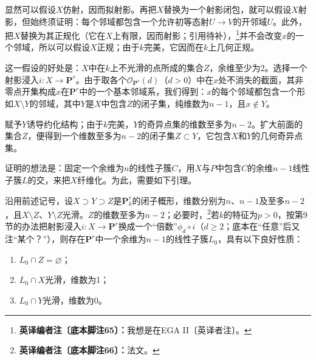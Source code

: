 显然可以假设$X$仿射，因而拟射影。再把$X$替换为一个射影闭包，就可以假设$X$射影，但始终须证明：每个邻域都包含一个允许初等态射$U\to V$的开邻域$U$。此外，把$X$替换为其正规化（它在$X$上有限，因而射影；引用待补），\footnote{\textbf{英译编者注〔底本脚注65〕：}我想是在EGA II〔英译者注〕。}并不会改变$x$的一个邻域，所以可以假设$X$正规；由于$k$完美，它因而在$k$上几何正规。


这一假设的好处是：$X$中在$k$上不光滑的点所成的集合$Z$，余维至少为2。选择一个射影浸入$i\colon X\to\mathbf P^r$。由于取各个$\mathcal O_{\mathbf P^r}(d)$（$d>0$）中在$x$处不消失的截面，其非零点开集构成$x$在$\mathbf P^r$中的一个基本邻域系，我们得到：$x$的每个邻域都包含一个形如$X\setminus Y$的邻域，其中$Y$是$X$中包含$Z$的闭子集，纯维数为$n-1$，且$x\notin Y$。

赋予$Y$诱导约化结构；由于$k$完美，$Y$的奇异点集的维数至多为$n-2$。扩大前面的集合$Z$，便得到一个维数至多为$n-2$的闭子集$Z\subset Y$，它包含$X$和$Y$的几何奇异点集。

证明的想法是：固定一个余维为$n$的线性子簇$C$，用$X$与$P$中包含$C$的余维$n-1$线性子簇$L$的交，来把$X$纤维化。为此，需要如下引理。

沿用前述记号，设$X\supset Y\supset Z$是$\mathbf P^r_k$的闭子概形，维数分别为$n$、$n-1$及至多$n-2$，且$X\setminus Z$、$Y\setminus Z$光滑。$Z$的维数至多为$n-2$；必要时，\footnote{\textbf{英译编者注〔底本脚注66〕：}法文。}若$k$的特征为$p>0$，按第9节的办法把射影浸入$i\colon X\to\mathbf P^r$换成一个“倍数”$\phi_d\circ i$（$d\geq2$；底本在“任意”后又注“某个？”），则存在$\mathbf P^r$中一个余维为$n-1$的线性子簇$L_0$，具有以下良好性质：
\begin{enumerate}
\item[a)] $L_0\cap Z=\varnothing$；
\item[b)] $L_0\cap X$光滑，维数为1；
\item[c)] $L_0\cap Y$光滑，维数为0。
\end{enumerate}


